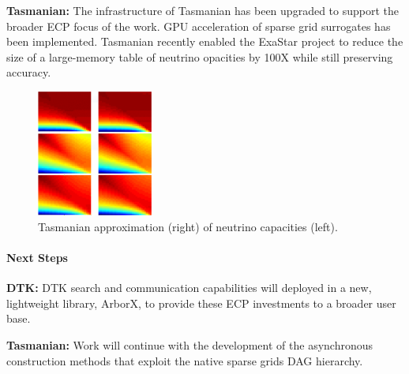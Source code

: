 {\bf Tasmanian:} The infrastructure of Tasmanian has been upgraded to support
the broader ECP focus of the work.  GPU acceleration of sparse grid surrogates
has been implemented.  Tasmanian recently enabled the ExaStar project to
reduce the size of a large-memory table of neutrino opacities by 100X while
still preserving accuracy.

\begin{figure}[htb]
        \centering
        \includegraphics[width=1.5in]{projects/2.3.3-MathLibs/2.3.3.11-ALExa/tasmanian-gpu}
        \caption{\label{fig:tasmanian-gpu}Tasmanian approximation (right) of neutrino capacities (left).}
\end{figure}


\paragraph{Next Steps}

\indent

{\bf DTK:} DTK search and communication capabilities will deployed in a new,
lightweight library, ArborX, to provide these ECP investments to a broader
user base.

{\bf Tasmanian:} Work will continue with the development of the asynchronous
construction methods that exploit the native sparse grids DAG hierarchy.

